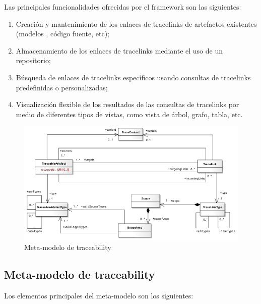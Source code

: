 \documentclass[a4paper,12pt,oneside,spanish]{book}
\begin{document}
Las principales funcionalidades ofrecidas por el framework son las siguientes:

\begin{enumerate}
\item Creación y mantenimiento de los enlaces de tracelinks de artefactos existentes (modelos , código fuente, etc);
\item Almacenamiento de los enlaces de tracelinks mediante el uso de un repositorio;
\item Búsqueda de enlaces de tracelinks específicos usando consultas de tracelinks predefinidas o personalizadas;
\item Visualización flexible de los resultados de las consultas de tracelinks por medio de diferentes tipos de vistas, como vista de árbol, grafo, tabla, etc.
\end{enumerate}

\begin{figure}[hbtp]
\centering
\includegraphics[scale=.62]{./img/Traceability_Metamodel}
\caption{Meta-modelo de traceability}
\label{fig:SPLMeta-modelo}
\end{figure}

\subsection{Meta-modelo de traceability}

Los elementos principales del meta-modelo son los siguientes:
\end{document}
